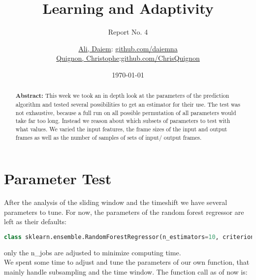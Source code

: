 \documentclass{scrartcl}
\begin{document}
\title{Learning and Adaptivity}
\subtitle{Report No. 4}
\author{
  \href{daiem.ali@smail.inf.h-brs.de}{Ali, Daiem}: \href{https://github.com/daiemna}{github.com/daiemna}\\
  \href{christophe.quignon@smail.inf.h-brs.de}{Quignon, Christophe}:\href{https://github.com/ChrisQuignon}{github.com/ChrisQuignon}
}
\date{\today}


\maketitle



\begin{abstract}
\textbf{Abstract:}
This week we took an in depth look at the parameters of the prediction algorithm and tested several possibilities to get an estimator for their use. The test was not exhaustive, because a full run on all possible permutation of all parameters would take far too long. Instead we reason about which subsets of parameters to test with what values. We varied the input features, the frame sizes of the input and output frames as well as the number of samples of sets of input/ output frames. 
\end{abstract}

\section{Parameter Test}
\label{sec:parameter}
After the analysis of the sliding window and the timeshift we have several parameters to tune. For now, the parameters of the random forest regressor are left as their defaults:
\begin{lstlisting}[language=Python]
class sklearn.ensemble.RandomForestRegressor(n_estimators=10, criterion='mse', max_depth=None, min_samples_split=2, min_samples_leaf=1, min_weight_fraction_leaf=0.0, max_features='auto', max_leaf_nodes=None, bootstrap=True, oob_score=False, n_jobs=1, random_state=None, verbose=0, warm_start=False)
\end{lstlisting}

only  the n\_jobs are adjusted to minimize computing time.\\
We spent some time to adjust and tune the parameters of our own function, that mainly handle subsampling and the time window. The function call as of now is:
\end{document}
